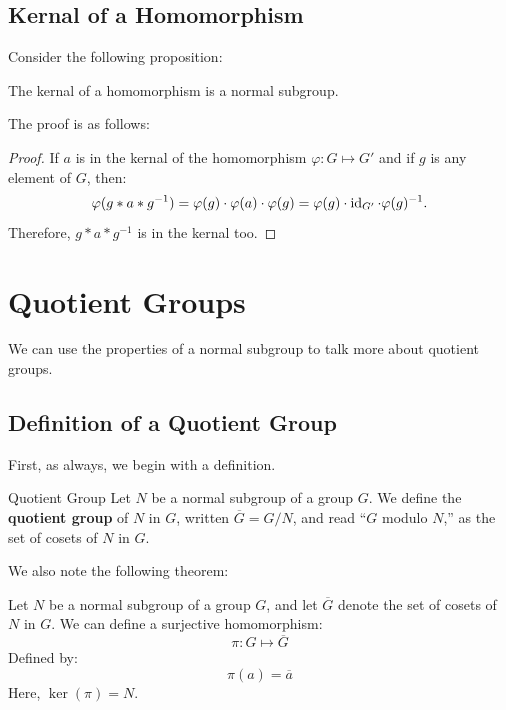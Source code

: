 \documentclass[letterpaper]{article}
\begin{document}
\subsection{Kernal of a Homomorphism}
Consider the following proposition: 
\begin{mdframed}
    \begin{proposition}
        The kernal of a homomorphism is a normal subgroup.
    \end{proposition}
\end{mdframed}

The proof is as follows: 
\begin{mdframed}
    \begin{proof}
        If $a$ is in the kernal of the homomorphism $\varphi: G \mapsto G'$ and if $g$ is any element of $G$, then: 
        \[\varphi(g * a * g^{-1}) = \varphi(g) \cdot \varphi(a) \cdot \varphi(g) = \varphi(g) \cdot \operatorname{id}_{G'} \cdot \varphi(g)^{-1}.\]
        Therefore, $g * a * g^{-1}$ is in the kernal too. 
    \end{proof}
\end{mdframed}
 











\newpage 
\section{Quotient Groups}
We can use the properties of a normal subgroup to talk more about quotient groups. 

\subsection{Definition of a Quotient Group}
First, as always, we begin with a definition. 
\begin{definition}{Quotient Group}{}
    Let $N$ be a normal subgroup of a group $G$. We define the \textbf{quotient group} of $N$ in $G$, written $\overline{G} = G/N$, and read ``$G$ modulo $N$,'' as the set of cosets of $N$ in $G$. 
\end{definition}

We also note the following theorem: 
\begin{theorem}{}{}
    Let $N$ be a normal subgroup of a group $G$, and let $\overline{G}$ denote the set of cosets of $N$ in $G$. We can define a surjective homomorphism: 
    \[\pi: G \mapsto \overline{G}\]
    Defined by: 
    \[\pi(a) = \overline{a}\]
    Here, $\ker(\pi) = N$. 
\end{theorem}
\end{document}
